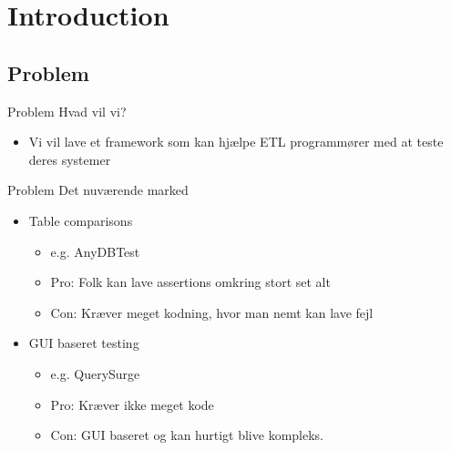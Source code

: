 \section{Introduction}

\subsection{Problem}
\begin{frame}{Problem}{}
  Hvad vil vi?
  \begin{itemize}
  \item Vi vil lave et framework som kan hjælpe ETL programmører med at teste deres systemer
  \end{itemize}
\end{frame}

\begin{frame}{Problem}{}
  Det nuværende marked
  \begin{itemize}
  \item<2-> Table comparisons
    \begin{itemize}
    \item e.g. AnyDBTest
    \item Pro: Folk kan lave assertions omkring stort set alt
    \item Con: Kræver meget kodning, hvor man nemt kan lave fejl
    \end{itemize}
  \item<3-> GUI baseret testing
    \begin{itemize}
    \item e.g. QuerySurge
    \item Pro: Kræver ikke meget kode
    \item Con: GUI baseret og kan hurtigt blive kompleks.
    \end{itemize}
  \end{itemize}
\end{frame}


